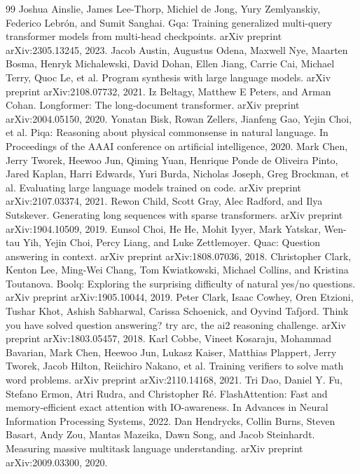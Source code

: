 \documentclass[a4paper,11pt]{article}
\begin{document}
\begin{thebibliography}{99}
\small
{} Joshua Ainslie, James Lee-Thorp, Michiel de Jong, Yury Zemlyanskiy, Federico Lebrón, and Sumit Sanghai. Gqa: Training generalized multi-query transformer models from multi-head checkpoints. arXiv preprint arXiv:2305.13245, 2023.
 Jacob Austin, Augustus Odena, Maxwell Nye, Maarten Bosma, Henryk Michalewski, David Dohan, Ellen Jiang, Carrie Cai, Michael Terry, Quoc Le, et al. Program synthesis with large language models. arXiv preprint arXiv:2108.07732, 2021.
 Iz Beltagy, Matthew E Peters, and Arman Cohan. Longformer: The long-document transformer. arXiv preprint arXiv:2004.05150, 2020.
 Yonatan Bisk, Rowan Zellers, Jianfeng Gao, Yejin Choi, et al. Piqa: Reasoning about physical commonsense in natural language. In Proceedings of the AAAI conference on artificial intelligence, 2020.
 Mark Chen, Jerry Tworek, Heewoo Jun, Qiming Yuan, Henrique Ponde de Oliveira Pinto, Jared Kaplan, Harri Edwards, Yuri Burda, Nicholas Joseph, Greg Brockman, et al. Evaluating large language models trained on code. arXiv preprint arXiv:2107.03374, 2021.
 Rewon Child, Scott Gray, Alec Radford, and Ilya Sutskever. Generating long sequences with sparse transformers. arXiv preprint arXiv:1904.10509, 2019.
 Eunsol Choi, He He, Mohit Iyyer, Mark Yatskar, Wen-tau Yih, Yejin Choi, Percy Liang, and Luke Zettlemoyer. Quac: Question answering in context. arXiv preprint arXiv:1808.07036, 2018.
 Christopher Clark, Kenton Lee, Ming-Wei Chang, Tom Kwiatkowski, Michael Collins, and Kristina Toutanova. Boolq: Exploring the surprising difficulty of natural yes/no questions. arXiv preprint arXiv:1905.10044, 2019.
 Peter Clark, Isaac Cowhey, Oren Etzioni, Tushar Khot, Ashish Sabharwal, Carissa Schoenick, and Oyvind Tafjord. Think you have solved question answering? try arc, the ai2 reasoning challenge. arXiv preprint arXiv:1803.05457, 2018.
 Karl Cobbe, Vineet Kosaraju, Mohammad Bavarian, Mark Chen, Heewoo Jun, Lukasz Kaiser, Matthias Plappert, Jerry Tworek, Jacob Hilton, Reiichiro Nakano, et al. Training verifiers to solve math word problems. arXiv preprint arXiv:2110.14168, 2021.
 Tri Dao, Daniel Y. Fu, Stefano Ermon, Atri Rudra, and Christopher Ré. FlashAttention: Fast and memory-efficient exact attention with IO-awareness. In Advances in Neural Information Processing Systems, 2022.
 Dan Hendrycks, Collin Burns, Steven Basart, Andy Zou, Mantas Mazeika, Dawn Song, and Jacob Steinhardt. Measuring massive multitask language understanding. arXiv preprint arXiv:2009.03300, 2020.

\end{thebibliography}
\end{document}
